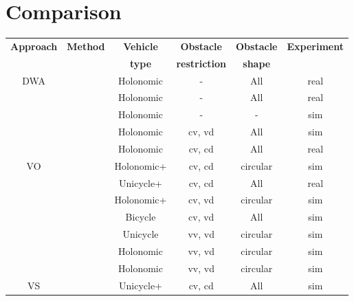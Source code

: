 \section{Comparison}%
\label{sec:comparision}

\begin{table}[htpb]
    \centering
    \begin{tabular}{cccccc}\toprule
        \textbf{Approach} & \textbf{Method} & \textbf{Vehicle} & \textbf{Obstacle} & \textbf{Obstacle} & \textbf{Experiment} \\
                          &    & \textbf{type} & \textbf{restriction} & \textbf{shape} & \\\toprule
        \multirow{5}{*}{DWA}&\cite{fox1997dynamic}              & Holonomic     & \-- & All & real \\
                            &\cite{brock1999high}               & Holonomic     & \-- & All & real \\
                            &\cite{ogren2005convergent}         & Holonomic     & \-- & \-- & sim \\
                            &\cite{seder2007dynamic}            & Holonomic     & cv, vd & All & sim \\
                            &\cite{chung2009safe}               & Holonomic     & cv, cd & All & real \\\midrule
        \multirow{6}{*}{VO} &\cite{fiorini1998motion}           & Holonomic+    & cv, cd & circular & sim \\
                            &\cite{prassler2001robotics}        & Unicycle+     & cv, cd & All & real \\
                            &\cite{shiller2001motion}           & Holonomic+    & cv, vd & circular & sim \\
                            &\cite{large2005navigation}         & Bicycle       & cv, vd & All & sim \\
                            &\cite{belkhouche2009reactive}      & Unicycle      & vv, vd & circular & sim \\
                            &\cite{van2008reciprocal}           & Holonomic     & vv, vd & circular & sim \\
                            &\cite{van2011reciprocal}           & Holonomic     & vv, vd & circular & sim \\\midrule
        \multirow{1}{*}{VS} &\cite{owen2005motion,owen2006a}    & Unicycle+     & cv, cd & All & sim \\\midrule

\end{tabular}
\end{table}
